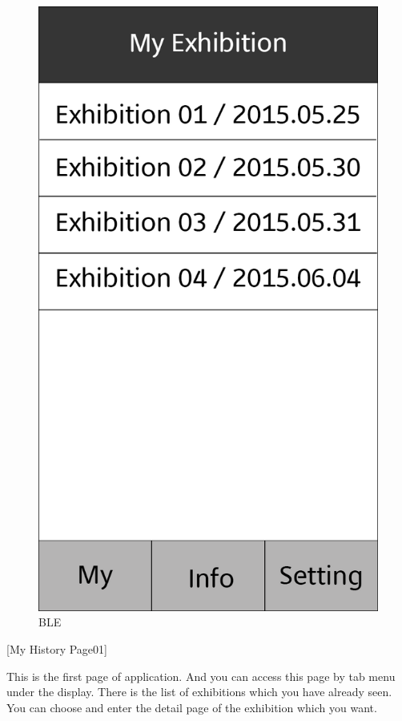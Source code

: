 \documentclass[conference]{IEEEtran}
\begin{document}
\begin{figure}[htbp]
\begin{center}
    \includegraphics[scale=0.2]{img_My01}
    \caption{BLE} 
\end{center}
\end{figure}


[My History Page01]

This is the first page of application. And you can access this page by tab menu under the display. There is the list of exhibitions which you have already seen. You can choose and enter the detail page of  the exhibition which you want.  \\
\end{document}

